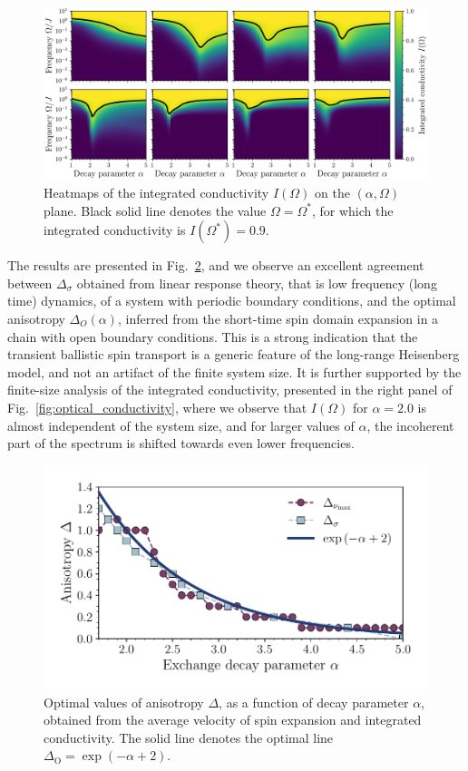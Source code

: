 \begin{figure}[htbp]
  \centering
  \includegraphics[width=\linewidth]{Figures/I_cond_heatmap.png}
  \caption{Heatmaps of the integrated conductivity \(I(\Omega)\) on the \((\alpha ,\Omega)\) plane.
  Black solid line denotes the value \(\Omega = \Omega^{\ast}\), 
  for which the integrated conductivity is \(I(\Omega^{\ast}) = 0.9\).}
  \label{fig:I_cond_heatmap}
\end{figure}

The results are presented in Fig.~\ref{fig:optimal_anisotropy}, and we observe an excellent
agreement between \(\Delta_{\sigma}\) obtained from linear response theory, that is low frequency (long time) dynamics,
of a system with periodic boundary conditions,
and the optimal anisotropy \(\Delta_{O}(\alpha)\), inferred from the short-time spin domain expansion in a chain
with open boundary conditions. This is a strong indication that the transient ballistic spin transport
is a generic feature of the long-range Heisenberg model, and not an artifact of the finite system size.
It is further supported by the finite-size analysis of the integrated conductivity, presented in the right panel
of Fig.~\ref{fig:optical_conductivity}, where we observe that \(I(\Omega)\) for \(\alpha = 2.0\)
is almost independent of the system size, and for larger values of \(\alpha\), the incoherent part of the spectrum
is shifted towards even lower frequencies.

\begin{figure}[htbp]
  \centering
  \includegraphics[width=0.8\linewidth]{Figures/optimal_anisotropies.pdf}
  \caption{Optimal values of anisotropy \(\Delta\), as a function of decay parameter \(\alpha\), obtained from
  the average velocity of spin expansion and integrated conductivity. The solid line denotes the optimal line
  \(\Delta_{\mathrm{O}} = \exp\left(-\alpha + 2\right)\).}
  \label{fig:optimal_anisotropy}
\end{figure}


